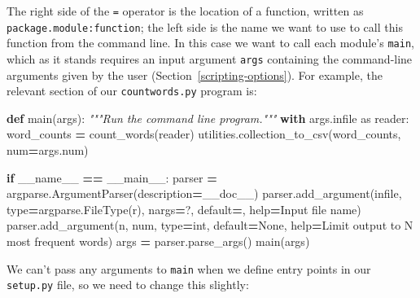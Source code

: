 \documentclass[
]{krantz}
\makeatletter
\newenvironment{Shaded}{\begin{snugshade}}{\end{snugshade}}
\newcommand{\BuiltInTok}[1]{#1}
\newcommand{\CommentTok}[1]{\textcolor[rgb]{0.56,0.35,0.01}{\textit{#1}}}
\newcommand{\ControlFlowTok}[1]{\textcolor[rgb]{0.13,0.29,0.53}{\textbf{#1}}}
\newcommand{\ImportTok}[1]{#1}
\newcommand{\KeywordTok}[1]{\textcolor[rgb]{0.13,0.29,0.53}{\textbf{#1}}}
\newcommand{\NormalTok}[1]{#1}
\newcommand{\OperatorTok}[1]{\textcolor[rgb]{0.81,0.36,0.00}{\textbf{#1}}}
\newcommand{\StringTok}[1]{\textcolor[rgb]{0.31,0.60,0.02}{#1}}
\newcommand{\VariableTok}[1]{\textcolor[rgb]{0.00,0.00,0.00}{#1}}
\newenvironment{kframe}{%
\medskip{}
\setlength{\fboxsep}{.8em}
 \def\at@end@of@kframe{}%
 \ifinner\ifhmode%
  \def\at@end@of@kframe{\end{minipage}}%
  \begin{minipage}{\columnwidth}%
 \fi\fi%
 \def\FrameCommand##1{\hskip\@totalleftmargin \hskip-\fboxsep
 \colorbox{shadecolor}{##1}\hskip-\fboxsep
     \hskip-\linewidth \hskip-\@totalleftmargin \hskip\columnwidth}%
 \MakeFramed {\advance\hsize-\width
   \@totalleftmargin\z@ \linewidth\hsize
   \@setminipage}}%
 {\par\unskip\endMakeFramed%
 \at@end@of@kframe}
\renewenvironment{Shaded}{\begin{kframe}}{\end{kframe}}
\makeatother
\begin{document}
The right side of the \texttt{=} operator is the location of a function,
written as \texttt{package.module:function};
the left side is the name we want to use to call this function from the command line.
In this case we want to call each module's \texttt{main},
which as it stands requires an input argument \texttt{args}
containing the command-line arguments given by the user (Section~\ref{scripting-options}).
For example,
the relevant section of our \texttt{countwords.py} program is:

\begin{Shaded}
\begin{Highlighting}[]
\KeywordTok{def}\NormalTok{ main(args):}
    \CommentTok{"""Run the command line program."""}
    \ControlFlowTok{with}\NormalTok{ args.infile }\ImportTok{as}\NormalTok{ reader:}
\NormalTok{        word\_counts }\OperatorTok{=}\NormalTok{ count\_words(reader)}
\NormalTok{    utilities.collection\_to\_csv(word\_counts, num}\OperatorTok{=}\NormalTok{args.num)}

\ControlFlowTok{if} \VariableTok{\_\_name\_\_} \OperatorTok{==} \StringTok{\textquotesingle{}\_\_main\_\_\textquotesingle{}}\NormalTok{:}
\NormalTok{    parser }\OperatorTok{=}\NormalTok{ argparse.ArgumentParser(description}\OperatorTok{=}\NormalTok{\_\_doc\_\_)}
\NormalTok{    parser.add\_argument(}\StringTok{\textquotesingle{}infile\textquotesingle{}}\NormalTok{, }\BuiltInTok{type}\OperatorTok{=}\NormalTok{argparse.FileType(}\StringTok{\textquotesingle{}r\textquotesingle{}}\NormalTok{), nargs}\OperatorTok{=}\StringTok{\textquotesingle{}?\textquotesingle{}}\NormalTok{,}
\NormalTok{                        default}\OperatorTok{=}\StringTok{\textquotesingle{}{-}\textquotesingle{}}\NormalTok{, }\BuiltInTok{help}\OperatorTok{=}\StringTok{\textquotesingle{}Input file name\textquotesingle{}}\NormalTok{)}
\NormalTok{    parser.add\_argument(}\StringTok{\textquotesingle{}{-}n\textquotesingle{}}\NormalTok{, }\StringTok{\textquotesingle{}{-}{-}num\textquotesingle{}}\NormalTok{, }\BuiltInTok{type}\OperatorTok{=}\BuiltInTok{int}\NormalTok{, default}\OperatorTok{=}\VariableTok{None}\NormalTok{,}
                        \BuiltInTok{help}\OperatorTok{=}\StringTok{\textquotesingle{}Limit output to N most frequent words\textquotesingle{}}\NormalTok{)}
\NormalTok{    args }\OperatorTok{=}\NormalTok{ parser.parse\_args()}
\NormalTok{    main(args)}
\end{Highlighting}
\end{Shaded}

We can't pass any arguments to \texttt{main} when we define entry points in our \texttt{setup.py} file,
so we need to change this slightly:
\end{document}
